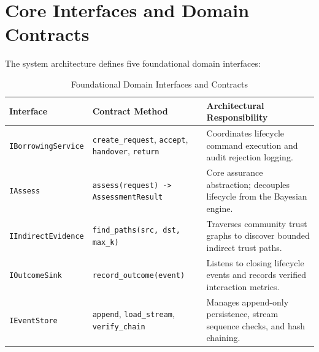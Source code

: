 \section{Core Interfaces and Domain Contracts}
The system architecture defines five foundational domain interfaces:
\begin{table}[htbp]
\centering
\caption{Foundational Domain Interfaces and Contracts}
\label{tab:core_interfaces}
\small
\begin{tabularx}{\textwidth}{l p{5cm} p{7cm}}
\toprule
\textbf{Interface} & \textbf{Contract Method} & \textbf{Architectural Responsibility} \\
\midrule
\texttt{IBorrowingService} & \texttt{create\_request}, \texttt{accept}, \texttt{handover}, \texttt{return} & Coordinates lifecycle command execution and audit rejection logging. \\
\texttt{IAssess} & \texttt{assess(request) -> AssessmentResult} & Core assurance abstraction; decouples lifecycle from the Bayesian engine. \\
\texttt{IIndirectEvidence} & \texttt{find\_paths(src, dst, max\_k)} & Traverses community trust graphs to discover bounded indirect trust paths. \\
\texttt{IOutcomeSink} & \texttt{record\_outcome(event)} & Listens to closing lifecycle events and records verified interaction metrics. \\
\texttt{IEventStore} & \texttt{append}, \texttt{load\_stream}, \texttt{verify\_chain} & Manages append-only persistence, stream sequence checks, and hash chaining. \\
\bottomrule
\end{tabularx}
\end{table}

